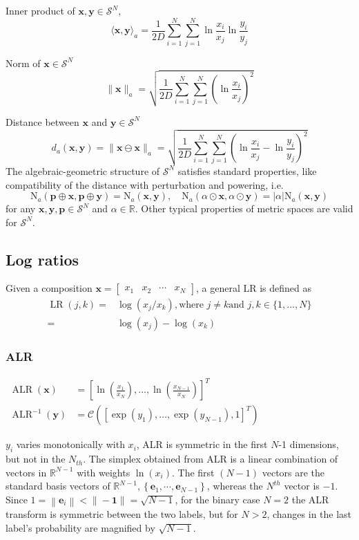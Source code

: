 \begin{appendices}
Inner product of $\mathbf{x}, \mathbf{y} \in \mathcal{S}^N$,
$$
\langle\mathbf{x}, \mathbf{y}\rangle_a=\frac{1}{2 D} \sum_{i=1}^N \sum_{j=1}^N \ln \frac{x_i}{x_j} \ln \frac{y_i}{y_j}
$$

Norm of $\mathbf{x} \in \mathcal{S}^N$
$$
\|\mathbf{x}\|_a=\sqrt{\frac{1}{2 D} \sum_{i=1}^N \sum_{j=1}^N\left(\ln \frac{x_i}{x_j}\right)^2}
$$

Distance between $\mathbf{x}$ and $\mathbf{y} \in \mathcal{S}^N$
$$
d_a(\mathbf{x}, \mathbf{y})=\|\mathbf{x} \ominus \mathbf{x}\|_a=\sqrt{\frac{1}{2 D} \sum_{i=1}^N \sum_{j=1}^N\left(\ln \frac{x_i}{x_j}-\ln \frac{y_i}{y_j}\right)^2}
$$
The algebraic-geometric structure of $\mathcal{S}^N$ satisfies standard properties, like compatibility of the distance with perturbation and powering, i.e.
$$
\mathrm{N}_a(\mathbf{p} \oplus \mathbf{x}, \mathbf{p} \oplus \mathbf{y})=\mathrm{N}_a(\mathbf{x}, \mathbf{y}), \quad \mathrm{N}_a(\alpha \odot \mathbf{x}, \alpha \odot \mathbf{y})=|\alpha| \mathrm{N}_a(\mathbf{x}, \mathbf{y})
$$
for any $\mathbf{x}, \mathbf{y}, \mathbf{p} \in \mathcal{S}^N$ and $\alpha \in \mathbb{R}$. Other typical properties of metric spaces are valid for $\mathcal{S}^N$. 

\subsection{Log ratios}
Given a composition $\mathbf{x}=\left[\begin{array}{llll}x_1 & x_2 & \cdots & x_N\end{array}\right]$, a general LR is defined as
$$
\begin{aligned}
\operatorname{LR}(j, k)= & \log \left(x_j / x_k\right), \text{where } j \neq k \text{and } j, k \in\{1, \ldots, N\}\\
=&  \log \left(x_j\right)-\log \left(x_k\right)
\end{aligned}
$$
\subsubsection{ALR}
$\begin{aligned} \operatorname{ALR}(\mathbf{x}) &=\left[\ln \left(\frac{x_1}{x_N}\right), \ldots, \ln \left(\frac{x_{N-1}}{x_N}\right)\right]^T \\ \operatorname{ALR}^{-1}(\mathbf{y}) &=\mathcal{C}\left(\left[\exp \left(y_1\right), \ldots, \exp \left(y_{N-1}\right), 1\right]^T\right) \end{aligned}$

$y_i$ varies monotonically with $x_i$, ALR is symmetric in the first $N$-1 dimensions, but not in the $N_{th}$. The simplex obtained from ALR is a linear combination of vectors in $\mathbb{R}^{N-1}$ with weights $\ln \left(x_i\right)$. The first $(N-1)$ vectors are the standard basis vectors of $\mathbb{R}^{N-1},\left\{\mathbf{e}_1, \cdots, \mathbf{e}_{N-1}\right\}$, whereas the $N^{t h}$ vector is $-1$. Since $1=\left\|\mathbf{e}_i\right\|<\|-\mathbf{1}\|=\sqrt{N-1}$, for the binary case $N=2$ the ALR transform is symmetric between the two labels, but for $N>2$, changes in the last label's probability are magnified by $\sqrt{N-1}$.  


\end{appendices}
